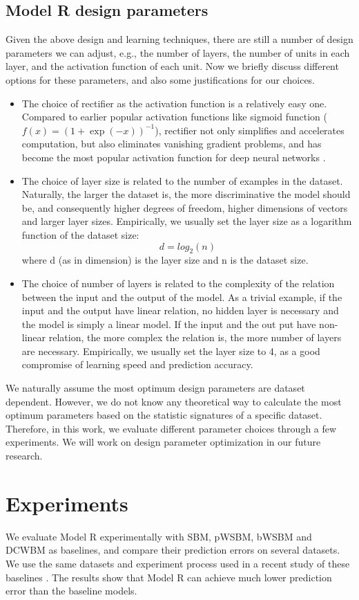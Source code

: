 \documentclass[conference]{IEEEtran}
\begin{document}
\subsection{Model R design parameters}
Given the above design and learning techniques,
there are still a number of design parameters we can adjust,
e.g., the number of layers, the number of units in each layer,
and the activation function of each unit.
Now we briefly discuss different options for these parameters,
and also some justifications for our choices.
\begin{itemize}
	\item The choice of rectifier as the activation function is a relatively easy one.
	Compared to earlier popular activation functions like sigmoid function
	($ f(x) = (1 + \exp(-x))^{-1} $),
	rectifier not only simplifies and accelerates computation,
	but also eliminates vanishing gradient problems,
	and has become the most popular activation function
	for deep neural networks \cite{lecun2015deep}.
	\item The choice of layer size is related to
	the number of examples in the dataset.
	Naturally, the larger the dataset is,
	the more discriminative the model should be,
	and consequently higher degrees of freedom,
	higher dimensions of vectors and larger layer sizes.
	Empirically, we usually set the layer size as a logarithm function of the dataset size:
	\[d = log_2(n)\]
	where d (as in dimension) is the layer size and n is the dataset size.
	\item The choice of number of layers is related to the complexity of the relation between the input and the output of the model.
	As a trivial example, if the input and the output have linear relation,
	no hidden layer is necessary and the model is simply a linear model.
	If the input and the out put have non-linear relation,
	the more complex the relation is, the more number of layers are necessary.
	Empirically, we usually set the layer size to 4,
	as a good compromise of learning speed and prediction accuracy.
\end{itemize}
We naturally assume the most optimum design parameters are dataset dependent.
However, we do not know any theoretical way to calculate the most optimum parameters based on the statistic signatures of a specific dataset.
Therefore, in this work, we evaluate different parameter choices through a few experiments.
We will work on design parameter optimization in our future research.

\section{Experiments}
We evaluate Model R experimentally with SBM, pWSBM, bWSBM and DCWBM as baselines,
and compare their prediction errors on several datasets.
We use the same datasets and experiment process used in a recent study of these baselines \cite{aicher2014learning}.
The results show 
that Model R can achieve much lower prediction error than the baseline models.
\end{document}
